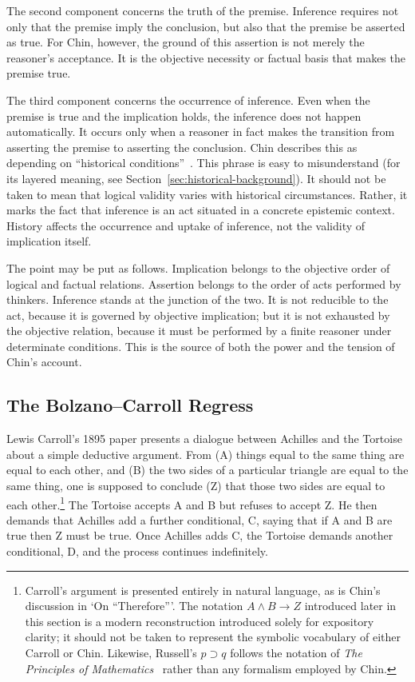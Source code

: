 \documentclass{birkjour}
\begin{document}
The second component concerns the truth of the premise. Inference requires not only that the premise imply the conclusion, but also that the premise be asserted as true. For Chin, however, the ground of this assertion is not merely the reasoner's acceptance. It is the objective necessity or factual basis that makes the premise true.

The third component concerns the occurrence of inference. Even when the premise is true and the implication holds, the inference does not happen automatically. It occurs only when a reasoner in fact makes the transition from asserting the premise to asserting the conclusion. Chin describes this as depending on ``historical conditions''~\cite[p.~49]{Liu2017}. This phrase is easy to misunderstand (for its layered meaning, see Section~\ref{sec:historical-background}). It should not be taken to mean that logical validity varies with historical circumstances. Rather, it marks the fact that inference is an act situated in a concrete epistemic context. History affects the occurrence and uptake of inference, not the validity of implication itself.

The point may be put as follows. Implication belongs to the objective order of logical and factual relations. Assertion belongs to the order of acts performed by thinkers. Inference stands at the junction of the two. It is not reducible to the act, because it is governed by objective implication; but it is not exhausted by the objective relation, because it must be performed by a finite reasoner under determinate conditions. This is the source of both the power and the tension of Chin's account.

\subsection{The Bolzano--Carroll Regress}

Lewis Carroll's 1895 paper presents a dialogue between Achilles and the Tortoise about a simple deductive argument. From (A) things equal to the same thing are equal to each other, and (B) the two sides of a particular triangle are equal to the same thing, one is supposed to conclude (Z) that those two sides are equal to each other.\footnote{Carroll's argument is presented entirely in natural language, as is Chin's discussion in `On ``Therefore'''. The notation $A \wedge B \rightarrow Z$ introduced later in this section is a modern reconstruction introduced solely for expository clarity; it should not be taken to represent the symbolic vocabulary of either Carroll or Chin. Likewise, Russell's $p \supset q$ follows the notation of \textit{The Principles of Mathematics}~\cite[\S\,38]{Russell1903} rather than any formalism employed by Chin.} The Tortoise accepts A and B but refuses to accept Z. He then demands that Achilles add a further conditional, C, saying that if A and B are true then Z must be true. Once Achilles adds C, the Tortoise demands another conditional, D, and the process continues indefinitely.
\end{document}
